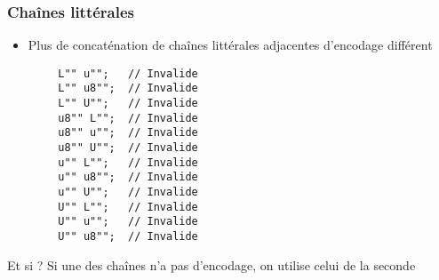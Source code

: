 \documentclass[C++.tex]{subfiles}
\begin{document}
\begin{frame}[fragile]
	\frametitle{Chaînes littérales}
	\begin{itemize}
		\item Plus de concaténation de chaînes littérales adjacentes d'encodage différent
	\end{itemize}

	\begin{verbatim}
		L"" u"";   // Invalide
		L"" u8"";  // Invalide
		L"" U"";   // Invalide
		u8"" L"";  // Invalide
		u8"" u"";  // Invalide
		u8"" U"";  // Invalide
		u"" L"";   // Invalide
		u"" u8"";  // Invalide
		u"" U"";   // Invalide
		U"" L"";   // Invalide
		U"" u"";   // Invalide
		U"" u8"";  // Invalide
	\end{verbatim}

	\begin{block}{Et si  ?}
		Si une des chaînes n'a pas d'encodage, on utilise celui de la seconde
	\end{block}

\end{frame}
\end{document}
